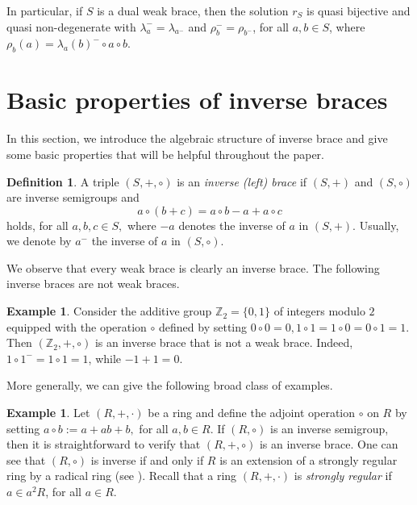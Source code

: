 \documentclass[preprint,1p]{elsarticle}
\theoremstyle{definition}               %
\newtheorem{defin}[theor]{Definition}
\newtheorem{ex}[theor]{Example}
\begin{document}
\noindent In particular,  if $S$ is a dual weak brace, then the solution $r_S$ is quasi bijective and quasi non-degenerate with $\lambda_a^-=\lambda_{a^-}$ and $\rho_b^-=\rho_{b^-}$, for all $a, b \in S$, where $\rho_b(a)=\lambda_a(b)^- \circ a \circ b$.
    
\medskip

\section{Basic properties of inverse braces}
 In this section, we introduce the algebraic structure of inverse brace and give some basic properties that will be helpful throughout the paper.


\smallskip


\begin{defin}
    A triple $(S, +, \circ)$ is an \emph{inverse (left) brace} if $(S, +)$ and $(S, \circ)$ are inverse semigroups and 
    \begin{equation*}\label{distrib_law}
        a \circ (b+c)=a\circ b -a+a \circ c
    \end{equation*}
    holds, for all $a,b,c \in S,$ where $-a$ denotes the inverse of $a$ in $(S, +)$. Usually, we denote by $a^-$ the inverse of $a$ in $(S,\circ)$.
\end{defin}




\smallskip
 We observe that every weak brace is clearly an inverse brace. The following inverse braces are not weak braces.


\begin{ex}\label{esempiowang}
    Consider the additive group  $\mathbb{Z}_2=\{0,1\}$ of integers modulo $2$ equipped with the operation $\circ$ defined by setting $ 0\circ 0=0, 1\circ 1=1\circ 0=0\circ 1=1$. Then $\left(\mathbb{Z}_2,+, \circ\right)$ is an inverse brace that is not a weak brace. Indeed, $1\circ 1^-=1\circ 1=1$, while $-1+1=0$.
   \end{ex}

More generally, we can give the following broad class of examples.
\begin{ex}\label{ex_ring}
Let $(R, +,\cdot)$ be a ring and define the adjoint operation $\circ$ on $R$ by setting $a \circ b := a + ab + b,$ for all $a, b \in R$. 
If $(R,\circ)$ is an inverse semigroup, then it is straightforward to verify that $(R, +, \circ)$ is an inverse brace. 
One can see that $(R,\circ)$ is inverse if and only if $R$ is an extension of a strongly regular ring by a radical ring  (see \cite[Theorem 6]{Xi88}). Recall that a ring $(R,+,\cdot)$ is \emph{strongly regular} if $a\in a^2 R$, for all $a\in R$.
\end{ex}
\end{document}
